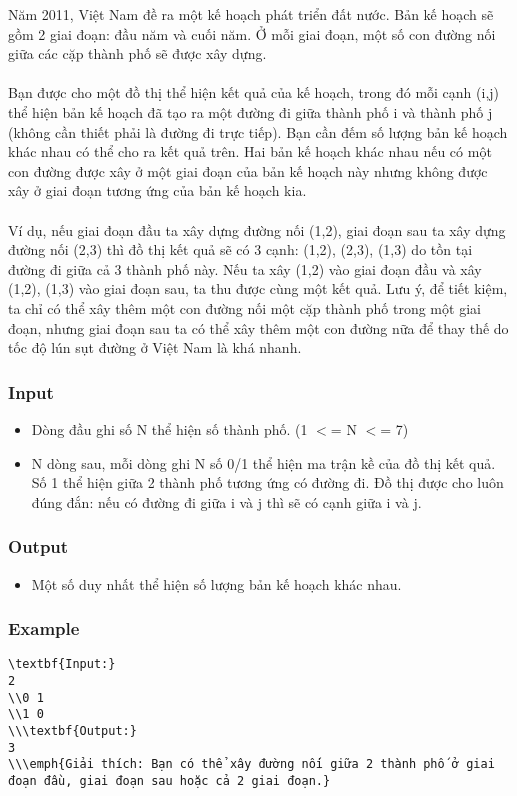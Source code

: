 



   Năm 2011, Việt Nam đề ra một kế hoạch phát triển đất nước. Bản kế hoạch sẽ gồm 2 giai đoạn: đầu năm và cuối năm. Ở mỗi giai đoạn, một số con đường nối giữa các cặp thành phố sẽ được xây dựng.   
\\
\\   Bạn được cho một đồ thị thể hiện kết quả của kế hoạch, trong đó mỗi cạnh (i,j) thể hiện bản kế hoạch đã tạo ra một đường đi giữa thành phố i và thành phố j (không cần thiết phải là đường đi trực tiếp). Bạn cần đếm số lượng bản kế hoạch khác nhau có thể cho ra kết quả trên. Hai bản kế hoạch khác nhau nếu có một con đường được xây ở một giai đoạn của bản kế hoạch này nhưng không được xây ở giai đoạn tương ứng của bản kế hoạch kia.   
\\
\\   Ví dụ, nếu giai đoạn đầu ta xây dựng đường nối (1,2), giai đoạn sau ta xây dựng đường nối (2,3) thì đồ thị kết quả sẽ có 3 cạnh: (1,2), (2,3), (1,3) do tồn tại đường đi giữa cả 3 thành phố này. Nếu ta xây (1,2) vào giai đoạn đầu và xây (1,2), (1,3) vào giai đoạn sau, ta thu được cùng một kết quả. Lưu ý, để tiết kiệm, ta chỉ có thể xây thêm một con đường nối một cặp thành phố trong một giai đoạn, nhưng giai đoạn sau ta có thể xây thêm một con đường nữa để thay thế do tốc độ lún sụt đường ở Việt Nam là khá nhanh.  

\subsubsection{   Input  }
\begin{itemize}
	\item     Dòng đầu ghi số N thể hiện số thành phố. (1 $<$= N $<$= 7)   
\end{itemize}
\begin{itemize}
	\item     N dòng sau, mỗi dòng ghi N số 0/1 thể hiện ma trận kề của đồ thị kết quả. Số 1 thể hiện giữa 2 thành phố tương ứng có đường đi. Đồ thị được cho luôn đúng đắn: nếu có đường đi giữa i và j thì sẽ có cạnh giữa i và j.   
\end{itemize}

\subsubsection{   Output  }
\begin{itemize}
	\item     Một số duy nhất thể hiện số lượng bản kế hoạch khác nhau.   
\end{itemize}

\subsubsection{   Example  }
\begin{verbatim}
\textbf{Input:}
2
\\0 1
\\1 0
\\\textbf{Output:}
3
\\\emph{Giải thích: Bạn có thể xây đường nối giữa 2 thành phố ở giai đoạn đầu, giai đoạn sau hoặc cả 2 giai đoạn.}\end{verbatim}
